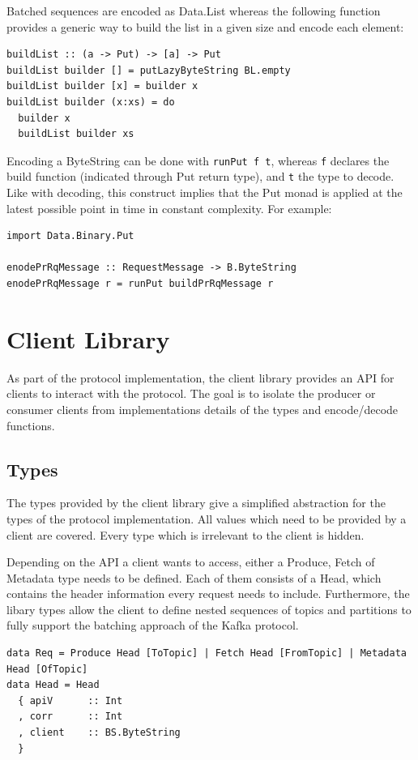 Batched sequences are encoded as Data.List whereas the following function
provides a generic way to build the list in a given size and encode each element:
\begin{lstlisting}[caption={Encode list of any type}]
buildList :: (a -> Put) -> [a] -> Put
buildList builder [] = putLazyByteString BL.empty
buildList builder [x] = builder x
buildList builder (x:xs) = do 
  builder x
  buildList builder xs
\end{lstlisting}

Encoding a ByteString can be done with \lstinline{runPut f t}, whereas
\lstinline{f} declares the build function (indicated through Put return type),
and  \lstinline{t} the type to decode. Like with decoding, this construct
implies that the Put monad is applied at the latest possible point in time in
constant complexity. For example: 
\begin{lstlisting}
import Data.Binary.Put

enodePrRqMessage :: RequestMessage -> B.ByteString
enodePrRqMessage r = runPut buildPrRqMessage r
\end{lstlisting}

\section{Client Library}
\label{sec:impl-prot-client}
As part of the protocol implementation, the client library provides an
API for clients to interact with the protocol. The goal is to isolate the
producer or consumer clients from implementations details of the types and
encode/decode functions. 

\subsection{Types}
The types provided by the client library give a simplified abstraction for
the types of the protocol implementation. All values which need to be
provided by a client are covered. Every type which is irrelevant to the client
is hidden.

Depending on the API a client wants to access, either a Produce, Fetch of
Metadata type needs to be defined. Each of them consists of a Head, which
contains the header information every request needs to include. Furthermore, the
libary types allow the client to define nested sequences of topics and
partitions to fully support the batching approach of the Kafka protocol. 
\begin{lstlisting}[caption={Simplified types for client API}]
data Req = Produce Head [ToTopic] | Fetch Head [FromTopic] | Metadata Head [OfTopic]
data Head = Head
  { apiV      :: Int
  , corr      :: Int
  , client    :: BS.ByteString
  }
\end{lstlisting}


